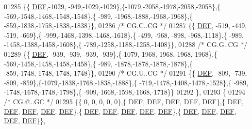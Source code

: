 \begin{DoxyCode}
01285 \{\{  \mbox{\hyperlink{1_88_84__epars_8h_a397419fc12b37ed479c8abb9d444d843}{DEF}},-1029, -949,-1029,-1029\},\{-1079,-2058,-1978,-2058,-2058\},\{ -569,-1548,-1468,-1548,-1548\},\{ -989,
      -1968,-1888,-1968,-1968\},\{ -859,-1838,-1758,-1838,-1838\}\},
01286 \textcolor{comment}{/* CG.C..CG */}
01287 \{\{  \mbox{\hyperlink{1_88_84__epars_8h_a397419fc12b37ed479c8abb9d444d843}{DEF}}, -519, -449, -519, -669\},\{ -999,-1468,-1398,-1468,-1618\},\{ -499, -968, -898, -968,-1118\},\{ -989,
      -1458,-1388,-1458,-1608\},\{ -789,-1258,-1188,-1258,-1408\}\},
01288 \textcolor{comment}{/* CG.G..CG */}
01289 \{\{  \mbox{\hyperlink{1_88_84__epars_8h_a397419fc12b37ed479c8abb9d444d843}{DEF}}, -939, -939, -939, -939\},\{-1079,-1968,-1968,-1968,-1968\},\{ -569,-1458,-1458,-1458,-1458\},\{ -989,
      -1878,-1878,-1878,-1878\},\{ -859,-1748,-1748,-1748,-1748\}\},
01290 \textcolor{comment}{/* CG.U..CG */}
01291 \{\{  \mbox{\hyperlink{1_88_84__epars_8h_a397419fc12b37ed479c8abb9d444d843}{DEF}}, -809, -739, -809, -859\},\{-1079,-1838,-1768,-1838,-1888\},\{ -719,-1478,-1408,-1478,-1528\},\{ -989,
      -1748,-1678,-1748,-1798\},\{ -909,-1668,-1598,-1668,-1718\}\}
01292 \},
01293 \{
01294 \textcolor{comment}{/* CG.@..GC */}
01295 \{\{    0,    0,    0,    0,    0\},\{  \mbox{\hyperlink{1_88_84__epars_8h_a397419fc12b37ed479c8abb9d444d843}{DEF}},  \mbox{\hyperlink{1_88_84__epars_8h_a397419fc12b37ed479c8abb9d444d843}{DEF}},  \mbox{\hyperlink{1_88_84__epars_8h_a397419fc12b37ed479c8abb9d444d843}{DEF}},  \mbox{\hyperlink{1_88_84__epars_8h_a397419fc12b37ed479c8abb9d444d843}{DEF}},  \mbox{\hyperlink{1_88_84__epars_8h_a397419fc12b37ed479c8abb9d444d843}{DEF}}\},\{  
      \mbox{\hyperlink{1_88_84__epars_8h_a397419fc12b37ed479c8abb9d444d843}{DEF}},  \mbox{\hyperlink{1_88_84__epars_8h_a397419fc12b37ed479c8abb9d444d843}{DEF}},  \mbox{\hyperlink{1_88_84__epars_8h_a397419fc12b37ed479c8abb9d444d843}{DEF}},  \mbox{\hyperlink{1_88_84__epars_8h_a397419fc12b37ed479c8abb9d444d843}{DEF}},  \mbox{\hyperlink{1_88_84__epars_8h_a397419fc12b37ed479c8abb9d444d843}{DEF}}\},\{  \mbox{\hyperlink{1_88_84__epars_8h_a397419fc12b37ed479c8abb9d444d843}{DEF}},  \mbox{\hyperlink{1_88_84__epars_8h_a397419fc12b37ed479c8abb9d444d843}{DEF}},  \mbox{\hyperlink{1_88_84__epars_8h_a397419fc12b37ed479c8abb9d444d843}{DEF}},  \mbox{\hyperlink{1_88_84__epars_8h_a397419fc12b37ed479c8abb9d444d843}{DEF}},  
      \mbox{\hyperlink{1_88_84__epars_8h_a397419fc12b37ed479c8abb9d444d843}{DEF}}\},\{  \mbox{\hyperlink{1_88_84__epars_8h_a397419fc12b37ed479c8abb9d444d843}{DEF}},  \mbox{\hyperlink{1_88_84__epars_8h_a397419fc12b37ed479c8abb9d444d843}{DEF}},  \mbox{\hyperlink{1_88_84__epars_8h_a397419fc12b37ed479c8abb9d444d843}{DEF}},  \mbox{\hyperlink{1_88_84__epars_8h_a397419fc12b37ed479c8abb9d444d843}{DEF}},  \mbox{\hyperlink{1_88_84__epars_8h_a397419fc12b37ed479c8abb9d444d843}{DEF}}\}\},

\end{DoxyCode}
